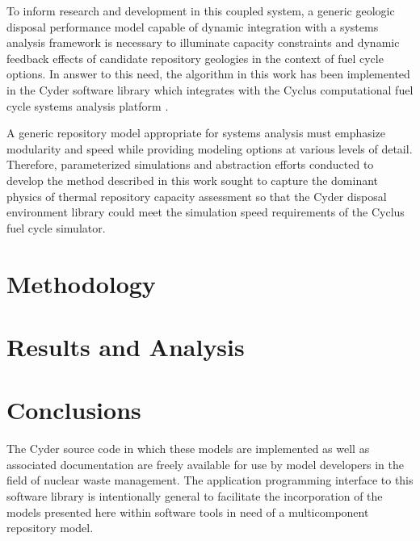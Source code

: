 \documentclass{anstrans}
\begin{document}
To inform research and development in this coupled system, a generic geologic disposal 
performance model capable of dynamic integration with a systems analysis 
framework is necessary to illuminate capacity constraints and dynamic feedback 
effects of candidate repository geologies in the context of fuel cycle options.
In answer to this need, the algorithm in this work has been implemented in the 
Cyder software library which integrates with the Cyclus computational 
fuel cycle systems analysis platform \cite{huff_cyder_2013,wilson_cyclus:_2012}. 



A generic repository model appropriate for systems analysis must emphasize 
modularity and speed while providing modeling options at various levels of 
detail. Therefore, parameterized simulations and abstraction efforts conducted to develop 
the method described in this work sought to capture the dominant physics of 
thermal repository capacity assessment so that the Cyder disposal environment 
library could meet the simulation speed requirements of the Cyclus fuel cycle 
simulator.

\section{Methodology}









\section{Results and Analysis}


\section{Conclusions}
The Cyder source code in which these models are implemented as well as 
associated documentation are freely available for use by model developers in the 
field of nuclear waste management. The application programming interface to this 
software library is intentionally general to facilitate the incorporation of the 
models presented here within software tools in need of a multicomponent repository 
model.
\end{document}
